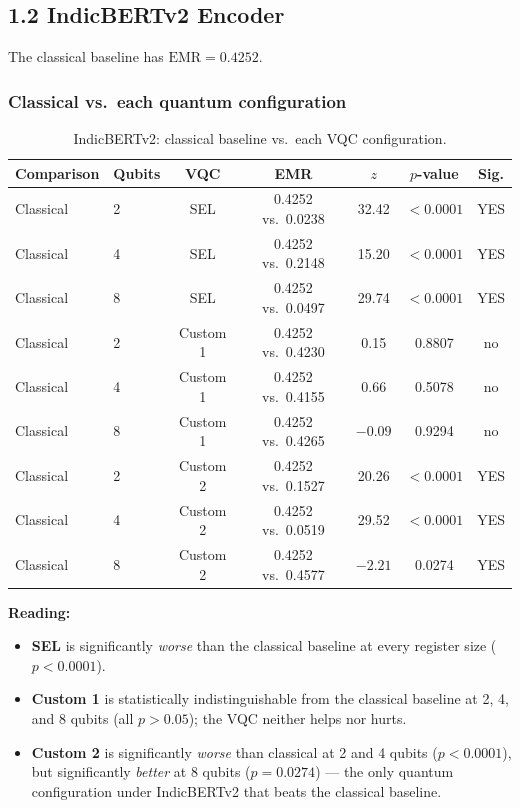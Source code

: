 \documentclass[11pt]{article}
\begin{document}
\subsection*{1.2 IndicBERTv2 Encoder}

The classical baseline has $\text{EMR} = 0.4252$.

\subsubsection*{Classical vs.\ each quantum configuration}
\begin{table}[h!]
\centering
\small
\begin{threeparttable}
\begin{tabular}{llccccc}
\toprule
\textbf{Comparison} & \textbf{Qubits} & \textbf{VQC} & \textbf{EMR} & $z$ & $p$-value & \textbf{Sig.} \\
\midrule
Classical & 2 & SEL     & 0.4252 vs.\ 0.0238 & 32.42 & $<0.0001$ & YES \\
Classical & 4 & SEL     & 0.4252 vs.\ 0.2148 & 15.20 & $<0.0001$ & YES \\
Classical & 8 & SEL     & 0.4252 vs.\ 0.0497 & 29.74 & $<0.0001$ & YES \\
\addlinespace
Classical & 2 & Custom 1 & 0.4252 vs.\ 0.4230 & 0.15 & 0.8807 & no \\
Classical & 4 & Custom 1 & 0.4252 vs.\ 0.4155 & 0.66 & 0.5078 & no \\
Classical & 8 & Custom 1 & 0.4252 vs.\ 0.4265 & $-0.09$ & 0.9294 & no \\
\addlinespace
Classical & 2 & Custom 2 & 0.4252 vs.\ 0.1527 & 20.26 & $<0.0001$ & YES \\
Classical & 4 & Custom 2 & 0.4252 vs.\ 0.0519 & 29.52 & $<0.0001$ & YES \\
Classical & 8 & Custom 2 & 0.4252 vs.\ 0.4577 & $-2.21$ & 0.0274 & YES \\
\bottomrule
\end{tabular}
\end{threeparttable}
\caption{IndicBERTv2: classical baseline vs.\ each VQC configuration.}
\end{table}

\noindent\textbf{Reading:}
\begin{itemize}
    \item \textbf{SEL} is significantly \emph{worse} than the classical baseline at every register size ($p<0.0001$).
    \item \textbf{Custom 1} is statistically indistinguishable from the classical baseline at 2, 4, and 8 qubits
    (all $p>0.05$); the VQC neither helps nor hurts.
    \item \textbf{Custom 2} is significantly \emph{worse} than classical at 2 and 4 qubits ($p<0.0001$), but
    significantly \emph{better} at 8 qubits ($p=0.0274$) --- the only quantum configuration under
    IndicBERTv2 that beats the classical baseline.
\end{itemize}
\end{document}
